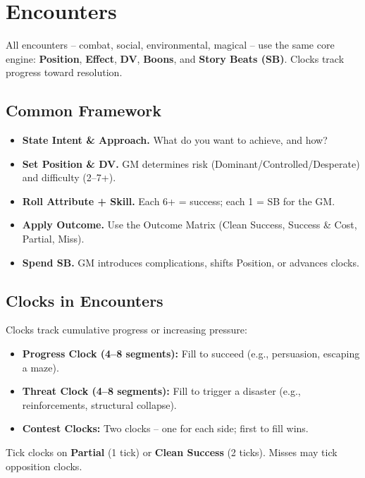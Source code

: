 \section{Encounters}

All encounters -- combat, social, environmental, magical -- use the same core engine: 
\textbf{Position}, \textbf{Effect}, \textbf{DV}, \textbf{Boons}, and \textbf{Story Beats (SB)}. 
Clocks track progress toward resolution.

\subsection{Common Framework}
\begin{itemize}[leftmargin=*]
  \item \textbf{State Intent \& Approach.} What do you want to achieve, and how?
  \item \textbf{Set Position \& DV.} GM determines risk (Dominant/Controlled/Desperate) and difficulty (2--7+).
  \item \textbf{Roll Attribute + Skill.} Each 6+ = success; each 1 = SB for the GM.
  \item \textbf{Apply Outcome.} Use the Outcome Matrix (Clean Success, Success \& Cost, Partial, Miss).
  \item \textbf{Spend SB.} GM introduces complications, shifts Position, or advances clocks.
\end{itemize}

\subsection{Clocks in Encounters}
Clocks track cumulative progress or increasing pressure:
\begin{itemize}[leftmargin=*]
  \item \textbf{Progress Clock (4--8 segments):} Fill to succeed (e.g., persuasion, escaping a maze).
  \item \textbf{Threat Clock (4--8 segments):} Fill to trigger a disaster (e.g., reinforcements, structural collapse).
  \item \textbf{Contest Clocks:} Two clocks -- one for each side; first to fill wins.
\end{itemize}
Tick clocks on \textbf{Partial} (1 tick) or \textbf{Clean Success} (2 ticks). Misses may tick opposition clocks.

